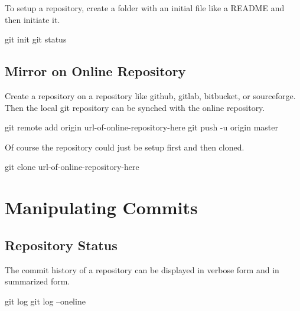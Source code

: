 \documentclass[]{book}
\newenvironment{Shaded}{\begin{snugshade}}{\end{snugshade}}
\newcommand{\FunctionTok}[1]{\textcolor[rgb]{0.00,0.00,0.00}{#1}}
\newcommand{\NormalTok}[1]{#1}
\begin{document}
To setup a repository, create a folder with an initial file like a
README and then initiate it.

\begin{Shaded}
\begin{Highlighting}[]
\FunctionTok{git}\NormalTok{ init}
\FunctionTok{git}\NormalTok{ status}
\end{Highlighting}
\end{Shaded}

\subsection{Mirror on Online
Repository}\label{mirror-on-online-repository}

Create a repository on a repository like github, gitlab, bitbucket, or
sourceforge. Then the local git repository can be synched with the
online repository.

\begin{Shaded}
\begin{Highlighting}[]
\FunctionTok{git}\NormalTok{ remote add origin url-of-online-repository-here}
\FunctionTok{git}\NormalTok{ push -u origin master}
\end{Highlighting}
\end{Shaded}

Of course the repository could just be setup first and then cloned.

\begin{Shaded}
\begin{Highlighting}[]
\FunctionTok{git}\NormalTok{ clone url-of-online-repository-here}
\end{Highlighting}
\end{Shaded}

\section{Manipulating Commits}\label{manipulating-commits}

\subsection{Repository Status}\label{repository-status}

The commit history of a repository can be displayed in verbose form and
in summarized form.

\begin{Shaded}
\begin{Highlighting}[]
\FunctionTok{git}\NormalTok{ log}
\FunctionTok{git}\NormalTok{ log --oneline}
\end{Highlighting}
\end{Shaded}
\end{document}
